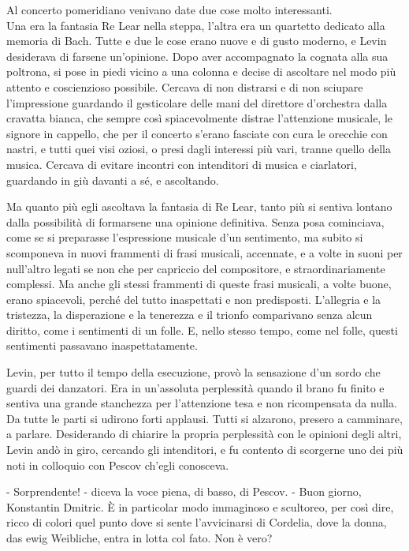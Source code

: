 Al concerto pomeridiano venivano date due cose molto interessanti. \\
Una era la fantasia Re Lear nella steppa, l'altra era un quartetto dedicato alla memoria di Bach. Tutte e due le cose erano nuove e di gusto moderno, e Levin desiderava di farsene un'opinione. Dopo aver accompagnato la cognata alla sua poltrona, si pose in piedi vicino a una colonna e decise di ascoltare nel modo più attento e coscienzioso possibile. Cercava di non distrarsi e di non sciupare l'impressione guardando il gesticolare delle mani del direttore d'orchestra dalla cravatta bianca, che sempre così spiacevolmente distrae l'attenzione musicale, le signore in cappello, che per il concerto s'erano fasciate con cura le orecchie con nastri, e tutti quei visi oziosi, o presi dagli interessi più vari, tranne quello della musica. Cercava di evitare incontri con intenditori di musica e ciarlatori, guardando in giù davanti a sé, e ascoltando. 

Ma quanto più egli ascoltava la fantasia di Re Lear, tanto più si sentiva lontano dalla possibilità di formarsene una opinione definitiva. Senza posa cominciava, come se si preparasse l'espressione musicale d'un sentimento, ma subito si scomponeva in nuovi frammenti di frasi musicali, accennate, e a volte in suoni per null'altro legati se non che per capriccio del compositore, e straordinariamente complessi. Ma anche gli stessi frammenti di queste frasi musicali, a volte buone, erano spiacevoli, perché del tutto inaspettati e non predisposti. L'allegria e la tristezza, la disperazione e la tenerezza e il trionfo comparivano senza alcun diritto, come i sentimenti di un folle. E, nello stesso tempo, come nel folle, questi sentimenti passavano inaspettatamente. 

Levin, per tutto il tempo della esecuzione, provò la sensazione d'un sordo che guardi dei danzatori. Era in un'assoluta perplessità quando il brano fu finito e sentiva una grande stanchezza per l'attenzione tesa e non ricompensata da nulla. Da tutte le parti si udirono forti applausi. Tutti si alzarono, presero a camminare, a parlare. Desiderando di chiarire la propria perplessità con le opinioni degli altri, Levin andò in giro, cercando gli intenditori, e fu contento di scorgerne uno dei più noti in colloquio con Pescov ch'egli conosceva. 

- Sorprendente! - diceva la voce piena, di basso, di Pescov. - Buon giorno, Konstantin Dmitric. È in particolar modo immaginoso e scultoreo, per così dire, ricco di colori quel punto dove si sente l'avvicinarsi di Cordelia, dove la donna, das ewig Weibliche, entra in lotta col fato. Non è vero? 

